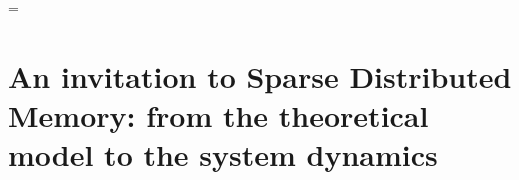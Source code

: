 

\emergencystretch=\maxdimen


\frenchspacing
\raggedbottom
{} %
\pagestyle{plain}



\pagestyle{scrheadings}
\cleardoublepage
\cleardoublepage

%

%


\part{An invitation to Sparse Distributed Memory: from the theoretical model to the system dynamics}
 
\cleardoublepage

